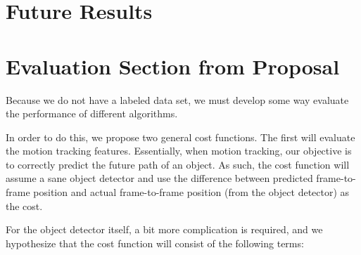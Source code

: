 \documentclass{article}
\begin{document}
\section{Future Results}

\section{Evaluation Section from Proposal}

Because we do not have a labeled data set, we must develop
some way evaluate the performance of different algorithms.

In order to do this, we propose two general cost functions.
The first will evaluate the motion tracking features.
Essentially, when motion tracking, our objective is to
correctly predict the future path of an object. As such,
the cost function will assume a sane object detector and
use the difference between predicted frame-to-frame position
and actual frame-to-frame position (from the object detector)
as the cost.

For the object detector itself, a bit more complication is
required, and we hypothesize that the cost function will
consist of the following terms:
\end{document}
